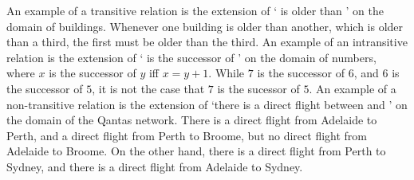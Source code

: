An example of a transitive relation is the extension of ` is older than ' on the domain of buildings. Whenever one building is older than another, which is older than a third, the first must be older than the third. An example of an intransitive relation is the extension of ` is the successor of ' on the domain of numbers, where $x$ is the successor of $y$ iff $x = y+1$. While $7$ is the successor of $6$, and $6$ is the successor of $5$, it is not the case that $7$ is the sucessor of $5$. An example of a non-transitive relation is the extension of `there is a direct flight between  and ' on the domain of the Qantas network. There is a direct flight from Adelaide to Perth, and a direct flight from Perth to Broome, but no direct flight from Adelaide to Broome. On the other hand, there is a direct flight from Perth to Sydney, and there is a direct flight from Adelaide to Sydney. 


